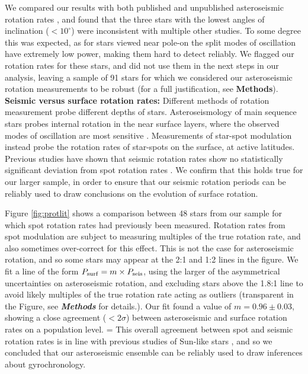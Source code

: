 \documentclass[12pt]{article}
\begin{document}
We compared our results with both published and unpublished asteroseismic rotation rates \cite{nielsen+2015,davies+2015,davies+2016, lund+2017, benomar+2018}, and found that the three stars with the lowest angles of inclination ($< 10^\circ$) were inconsistent with multiple other studies. To some degree this was expected, as  for stars viewed near pole-on the split modes of oscillation have extremely low power, making them hard to detect reliably. We flagged our rotation rates for these stars, and did not use them in the next steps in our analysis, leaving a sample of 91 stars for which we considered our asteroseismic rotation measurements to be robust (for a full justification, see \textbf{Methods}).\\

\textbf{Seismic versus surface rotation rates:} Different methods of rotation measurement probe different depths of stars. Asteroseismology of main sequence stars probes internal rotation in the near surface layers, where the observed modes of oscillation are most sensitive \cite{lund+2014}. Measurements of star-spot modulation instead probe the rotation rates of star-spots on the surface, at active latitudes. Previous studies have shown that seismic rotation rates show no statistically significant deviation from spot rotation rates \cite{nielsen+2015, benomar+2015}. We confirm that this holds true for our larger sample, in order to ensure that our seismic rotation periods can be reliably used to draw conclusions on the evolution of surface rotation.

Figure \ref{fig:protlit} shows a comparison between 48 stars from our sample for which spot  rotation rates had previously been measured. Rotation rates from spot modulation are subject to measuring multiples of the true rotation rate, and also sometimes over-correct for this effect. This is not the case for asteroseismic rotation, and so some stars may appear at the 2:1 and 1:2 lines in the figure. We fit a line of the form $P_{\rm surf} = m \times P_{\rm seis}$, using the larger of the asymmetrical uncertainties on asteroseismic rotation, and excluding stars above the 1.8:1 line to avoid likely multiples of the true rotation rate acting as outliers (transparent in the Figure, see \textit{\textbf{Methods}} for details.). Our fit found a value of $m = 0.96 \pm 0.03$, showing a close agreement ($<2\sigma$) between asteroseismic and surface rotation rates on a population level. =
This overall agreement between spot and seismic rotation rates is in line with previous studies of Sun-like stars \cite{nielsen+2015, benomar+2015, gizon+2013, chaplin+2013}, and so we concluded that our asteroseismic ensemble can be reliably used to draw inferences about gyrochronology.\\
\end{document}
